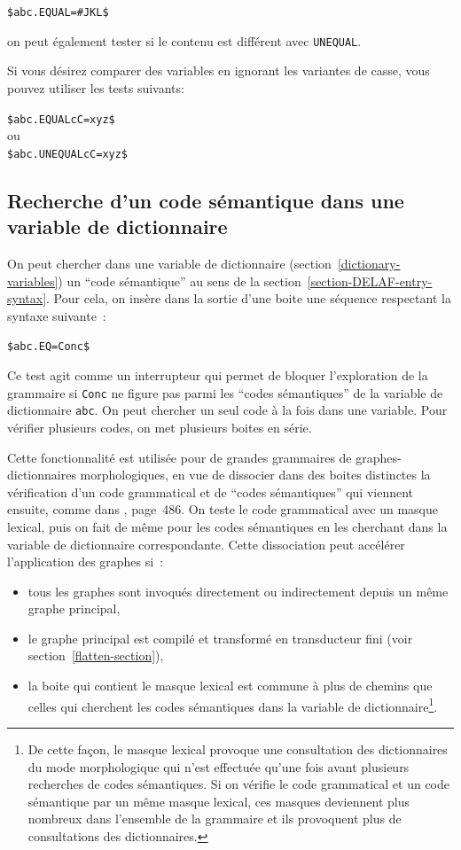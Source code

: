 \bigskip
\noindent \verb+$abc.EQUAL=#JKL$+

\bigskip
\noindent on peut également tester si le contenu est différent avec \verb+UNEQUAL+.

\bigskip
\noindent Si vous désirez comparer des variables en ignorant les variantes de casse, vous pouvez
utiliser les tests suivants:

\bigskip
\noindent \verb+$abc.EQUALcC=xyz$+ \\
ou \\
\verb+$abc.UNEQUALcC=xyz$+

\subsection{Recherche d'un code sémantique dans une variable de dictionnaire}
On peut chercher dans une variable de dictionnaire 
(section~\ref{dictionary-variables}) un ``code sémantique'' au sens de la section~\ref{section-DELAF-entry-syntax}.
Pour cela, on insère dans la sortie d'une boite une séquence respectant la syntaxe suivante~:

\bigskip
\noindent \verb+$abc.EQ=Conc$+

\bigskip
\noindent Ce test agit comme un interrupteur qui permet de bloquer l'exploration de la grammaire si \verb+Conc+
ne figure pas parmi les ``codes sémantiques'' de la variable de dictionnaire \verb+abc+. On peut chercher
un seul code à la fois dans une variable. Pour vérifier plusieurs codes, on met plusieurs boites en série.

\bigskip
\noindent Cette fonctionnalité est utilisée pour de grandes grammaires de graphes-dictionnaires morphologiques, en vue de
dissocier dans des boites distinctes la vérification d'un code grammatical et de ``codes sémantiques'' qui viennent ensuite,
comme dans \cite{paumier_nam_2014}, page~486.
On teste le code grammatical avec un masque lexical, puis on fait de même pour les codes sémantiques
en les cherchant dans la variable de dictionnaire correspondante.
Cette dissociation peut accélérer l'application des graphes si~:
\begin{itemize}
\item tous les graphes sont invoqués directement ou indirectement depuis un même graphe principal, 
\item le graphe principal est compilé et transformé en transducteur fini (voir section~\ref{flatten-section}),
\item la boite qui contient le masque lexical est commune à plus de chemins que celles qui cherchent les codes sémantiques
dans la variable de dictionnaire\footnote{De cette façon, le masque lexical provoque une consultation des dictionnaires du mode morphologique qui n'est effectuée qu'une fois avant plusieurs recherches de codes sémantiques.
Si on vérifie le code grammatical et un code sémantique par un même masque lexical, ces masques deviennent plus
nombreux dans l'ensemble de la grammaire et ils provoquent plus de consultations des dictionnaires.}.
\end{itemize}

